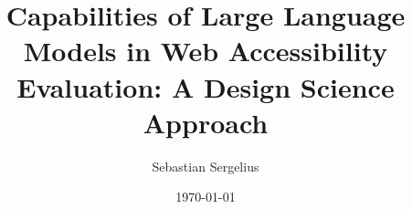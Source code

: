 \documentclass[english,twoside,censored,csm,software-track-2020]{HYthesisML}
\title{Capabilities of Large Language Models in Web Accessibility Evaluation: A Design Science Approach}
\author{Sebastian Sergelius}
\date{\today}
\begin{document}
\maketitle



\mytableofcontents

\mainmatter









\printbibliography

\backmatter
\begin{appendices}

\end{appendices}
\end{document}
